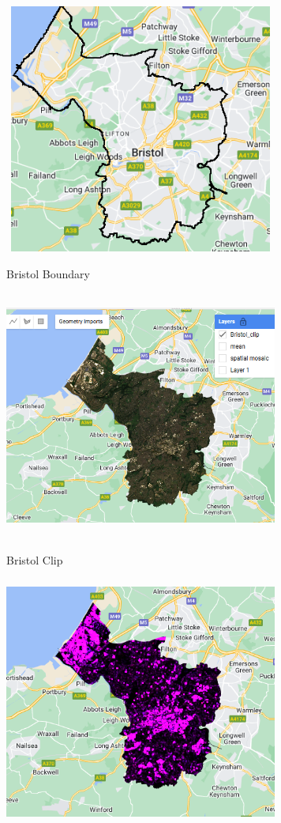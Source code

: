 \documentclass[
  letterpaper,
  DIV=11,
  numbers=noendperiod]{scrreprt}
\begin{document}
\includegraphics[width=3.54167in,height=3.22917in]{images/wk6/bristolbound.png}

Bristol Boundary

\includegraphics[width=3.54167in,height=3.22917in]{images/wk6/bristolclip.png}

Bristol Clip

\includegraphics[width=3.54167in,height=3.22917in]{images/wk6/glcm.png}
\end{document}
